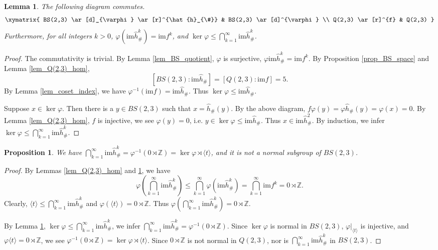 \documentclass[12pt]{amsart}
\theoremstyle{plain}
\newtheorem{proposition}[theorem]{Proposition}
\newtheorem{lemma}[theorem]{Lemma}
\theoremstyle{definition}
\theoremstyle{question}
\theoremstyle{remark}
\theoremstyle{assumption}
\numberwithin{equation}{section}
\theoremstyle{bigthm}
\begin{document}
\begin{lemma}\label{lem_BS_diagram}
The following diagram commutes.
\[
\xymatrix{
  BS(2,3) \ar[d]_{\varphi} \ar[r]^{\hat{h}_{\#}} & BS(2,3) \ar[d]^{\varphi} \\
  Q(2,3) \ar[r]^{f} & Q(2,3)   }
\]
Furthermore, for all integers $k>0$, $\varphi (\mathrm{im} \hat{h}_{\#}^{k} )= \mathrm{im} f^{k}$, and $\ker \varphi \le \bigcap_{k=1}^{\infty} \mathrm{im} \hat{h}_{\#}^{k}$.
\end{lemma}
\begin{proof}
The commutativity is trivial. By Lemma \ref{lem_BS_quotient}, $\varphi$ is surjective, $\varphi \mathrm{im} \hat{h}_{\#}^{k} = \mathrm{im} f^{k}$. By Proposition \ref{prop_BS_space} and Lemma \ref{lem_Q(2,3)_hom},
\[
[BS(2,3): \mathrm{im} \hat{h}_{\#}] = [Q(2,3): \mathrm{im} f] =5.
\]
By Lemma \ref{lem_coset_index}, we have $\varphi^{-1} (\mathrm{im} f) = \mathrm{im} \hat{h}_{\#}$. Thus $\ker \varphi \le \mathrm{im} \hat{h}_{\#}$.

Suppose $x \in \ker \varphi$. Then there is a $y \in  BS(2,3)$ such that $x = \hat{h}_{\#} (y)$. By the above diagram, $f \varphi (y) = \varphi \hat{h}_{\#} (y) = \varphi (x) =0$. By Lemma \ref{lem_Q(2,3)_hom}, $f$ is injective, we see $\varphi (y) = 0$, i.e. $y \in \ker \varphi \le \mathrm{im} \hat{h}_{\#}$. Thus $x \in \mathrm{im} \hat{h}_{\#}^{2}$. By induction, we infer $\ker \varphi \le \bigcap_{k=1}^{\infty} \mathrm{im} \hat{h}_{\#}^{k}$.
\end{proof}

\begin{proposition}\label{prop_BS_intersection}
We have $\bigcap_{k=1}^{\infty} \mathrm{im} \hat{h}_{\#}^{k} = \varphi^{-1} (0 \rtimes \mathbb{Z}) = \ker \varphi \rtimes \langle t \rangle$, and it is not a normal subgroup of $BS(2,3)$.
\end{proposition}
\begin{proof}
By Lemmas \ref{lem_Q(2,3)_hom} and \ref{lem_BS_diagram}, we have
\[
\varphi \left( \bigcap_{k=1}^{\infty} \mathrm{im} \hat{h}_{\#}^{k} \right) \le \bigcap_{k=1}^{\infty} \varphi (\mathrm{im} \hat{h}_{\#}^{k} )= \bigcap_{k=1}^{\infty} \mathrm{im} f^{k} = 0 \rtimes \mathbb{Z}.
\]
Clearly, $\langle t \rangle \le \bigcap_{k=1}^{\infty} \mathrm{im} \hat{h}_{\#}^{k}$ and $\varphi (\langle t \rangle) = 0 \rtimes \mathbb{Z}$. Thus $\varphi (\bigcap_{k=1}^{\infty} \mathrm{im} \hat{h}_{\#}^{k}) = 0 \rtimes \mathbb{Z}$.

By Lemma \ref{lem_BS_diagram}, $\ker \varphi \le \bigcap_{k=1}^{\infty} \mathrm{im} \hat{h}_{\#}^{k}$, we infer $\bigcap_{k=1}^{\infty} \mathrm{im} \hat{h}_{\#}^{k} = \varphi^{-1} (0 \rtimes \mathbb{Z})$. Since $\ker \varphi$ is normal in $BS(2,3)$, $\varphi|_{\langle t \rangle}$ is injective, and $\varphi \langle t \rangle = 0 \rtimes \mathbb{Z}$, we see $\varphi^{-1} (0 \rtimes \mathbb{Z}) = \ker \varphi \rtimes \langle t \rangle$. Since $0 \rtimes \mathbb{Z}$ is not normal in $Q(2,3)$, nor is $\bigcap_{k=1}^{\infty} \mathrm{im} \hat{h}_{\#}^{k}$ in $BS(2,3)$.
\end{proof}
\end{document}
